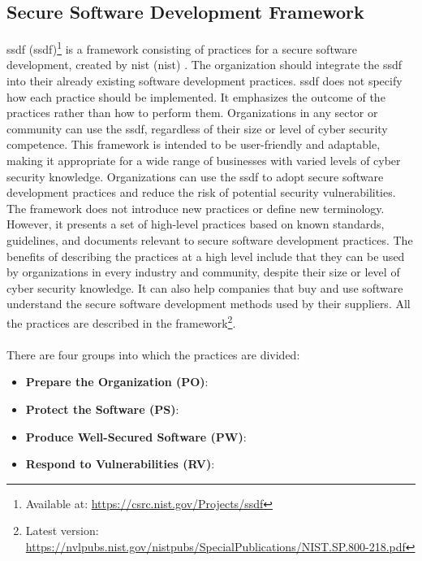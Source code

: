 \subsection{Secure Software Development Framework}
\label{ssdf}
\acrlong{ssdf} (\acrshort{ssdf})\footnote{Available at: \url{https://csrc.nist.gov/Projects/ssdf}} is a framework consisting of practices for a secure software development, created by \acrlong{nist} (\acrshort{nist}) \cite{ssdf}. The organization should integrate the \acrshort{ssdf} into their already existing software development practices. \acrshort{ssdf} does not specify how each practice should be implemented. It emphasizes the outcome of the practices rather than how to perform them. Organizations in any sector or community can use the \acrshort{ssdf}, regardless of their size or level of cyber security competence. This framework is intended to be user-friendly and adaptable, making it appropriate for a wide range of businesses with varied levels of cyber security knowledge. Organizations can use the \acrshort{ssdf} to adopt secure software development practices and reduce the risk of potential security vulnerabilities. The framework does not introduce new practices or define new terminology. However, it presents a set of high-level practices based on known standards, guidelines, and documents relevant to secure software development practices. 
\newpage
The benefits of describing the practices at a high level include that they can be used by organizations in every industry and community, despite their size or level of cyber security knowledge. It can also help companies that buy and use software understand the secure software development methods used by their suppliers. All the practices are described in the framework\footnote{Latest version: \url{https://nvlpubs.nist.gov/nistpubs/SpecialPublications/NIST.SP.800-218.pdf}}.
\\~\\
There are four groups into which the practices are divided:
\begin{itemize}
  \item \textbf{Prepare the Organization (PO)}: \textit{}\cite{ssdf}
  \item \textbf{Protect the Software (PS)}: \textit{}\cite{ssdf}
  \item \textbf{Produce Well-Secured Software (PW)}: \textit{}\cite{ssdf}
  \item \textbf{Respond to Vulnerabilities (RV)}: \textit{}\cite{ssdf}
\end{itemize}


